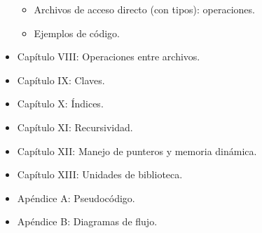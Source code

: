 \documentclass{article}
\begin{document}
\begin{itemize}
\begin{itemize}
	\item Archivos de acceso directo (con tipos): operaciones.
	\item Ejemplos de código.
	\end{itemize}
\item Capítulo VIII: Operaciones entre archivos.
\item Capítulo IX: Claves.
\item Capítulo X: Índices.
\item Capítulo XI: Recursividad.
\item Capítulo XII: Manejo de punteros y memoria dinámica.
\item Capítulo XIII: Unidades de biblioteca.
\item Apéndice A: Pseudocódigo.
\item Apéndice B: Diagramas de flujo.
\end{itemize}
 
\end{document}
